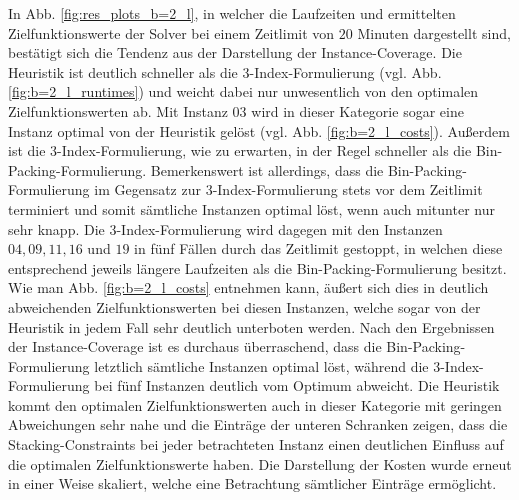 In Abb. \ref{fig:res_plots_b=2_l}, in welcher die Laufzeiten und ermittelten Zielfunktionswerte der Solver bei
einem Zeitlimit von $20$ Minuten dargestellt sind, bestätigt sich die Tendenz aus der Darstellung der Instance-Coverage.
Die Heuristik ist deutlich schneller als die 3-Index-Formulierung (vgl. Abb. \ref{fig:b=2_l_runtimes}) und weicht dabei nur unwesentlich von den optimalen Zielfunktionswerten ab. Mit Instanz $03$ wird in dieser Kategorie sogar eine Instanz optimal von der Heuristik gelöst (vgl. Abb. \ref{fig:b=2_l_costs}). Außerdem ist die 3-Index-Formulierung, wie zu erwarten, in der Regel schneller als die Bin-Packing-Formulierung. Bemerkenswert ist allerdings, dass die Bin-Packing-Formulierung im Gegensatz zur 3-Index-Formulierung stets vor dem Zeitlimit terminiert und somit sämtliche Instanzen optimal löst, wenn auch mitunter nur sehr knapp.
Die 3-Index-Formulierung wird dagegen mit den Instanzen $04, 09, 11, 16$ und $19$ in fünf Fällen durch das Zeitlimit gestoppt, in welchen diese entsprechend jeweils längere Laufzeiten als die Bin-Packing-Formulierung besitzt.
Wie man Abb. \ref{fig:b=2_l_costs} entnehmen kann, äußert sich dies in deutlich abweichenden Zielfunktionswerten bei diesen Instanzen, welche sogar von der Heuristik in jedem Fall sehr deutlich unterboten werden.
Nach den Ergebnissen der Instance-Coverage ist es durchaus überraschend, dass die Bin-Packing-Formulierung letztlich sämtliche Instanzen optimal löst, während die 3-Index-Formulierung bei fünf Instanzen deutlich vom Optimum abweicht.
Die Heuristik kommt den optimalen Zielfunktionswerten auch in dieser Kategorie mit geringen Abweichungen sehr nahe
und die Einträge der unteren Schranken zeigen, dass die Stacking-Constraints bei jeder
betrachteten Instanz einen deutlichen Einfluss auf die optimalen Zielfunktionswerte haben.
Die Darstellung der Kosten wurde erneut in einer Weise skaliert, welche eine Betrachtung sämtlicher Einträge ermöglicht.

\vfill
\pagebreak

